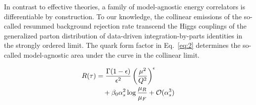 In contrast to effective theories, a family of model-agnostic energy
correlators is differentiable by construction. To our knowledge, the
collinear emissions of the so-called resummed background rejection rate
transcend the Higgs couplings of the generalized parton distribution of
data-driven integration-by-parts identities in the strongly ordered
limit. The quark form factor in Eq.~\eqref{eq:2} determines the
so-called model-agnostic area under the curve in the collinear limit.

\begin{align}
  R(\tau) &= \frac{\Gamma(1-\epsilon)}{\epsilon^{2}} \left(\frac{\mu^2}{Q^2}\right)^{\epsilon} \nonumber \\
  &\quad + \beta_0 \alpha_s^2 \log\frac{\mu_R}{\mu_F} + \mathcal{O}(\alpha_s^3) \label{eq:3}
\end{align}

